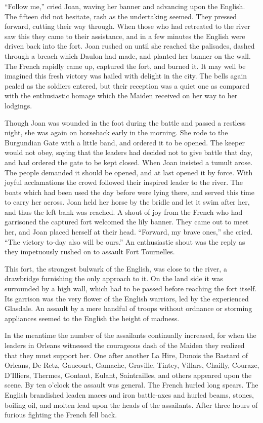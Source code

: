 ``Follow me,'' cried Joan, waving her banner and advancing upon the
English. The fifteen did not hesitate, rash as the undertaking seemed.
They pressed forward, cutting their way through. When those who had
retreated to the river saw this they came to their assistance, and in a
few minutes the English were driven back into the fort. Joan rushed on
until she reached the palisades, dashed through a breach which Daulon
had made, and planted her banner on the wall. The French rapidly came
up, captured the fort, and burned it. It may well be imagined this fresh
victory was hailed with delight in the city. The bells again pealed as
the soldiers entered, but their reception was a quiet one as compared
with the enthusiastic homage which the Maiden received on her way to her
lodgings.

Though Joan was wounded in the foot during the battle and passed a
restless night, she was again on horseback early in the morning. She
rode to the Burgundian Gate with a little band, and ordered it to be
opened. The keeper would not obey, saying that the leaders had decided
not to give battle that day, and had ordered the gate to be kept closed.
When Joan insisted a tumult arose. The people demanded it should be
opened, and at last opened it by force. With joyful acclamations the
crowd followed their inspired leader to the river. The boats which had
been used the day before were lying there, and served this time to carry
her across. Joan held her horse by the bridle and let it swim after her,
and thus the left bank was reached. A shout of joy from the French who
had garrisoned the captured fort welcomed the lily banner. They came out
to meet her, and Joan placed herself at their head. ``Forward, my brave
ones,'' she cried. ``The victory to-day also will be ours.'' An
enthusiastic shout was the reply as they impetuously rushed on to
assault Fort Tournelles.

This fort, the strongest bulwark of the English, was close to the river,
a drawbridge furnishing the only approach to it. On the land side it was
surrounded by a high wall, which had to be passed before reaching the
fort itself. Its garrison was the very flower of the English warriors,
led by the experienced Glasdale. An assault by a mere handful of troops
without ordnance or storming appliances seemed to the English the height
of madness.

In the meantime the number of the assailants continually increased, for
when the leaders in Orleans witnessed the courageous dash of the Maiden
they realized that they must support her. One after another La Hire,
Dunois the Bastard of Orleans, De Retz, Gaucourt, Gamache, Graville,
Tintey, Villars, Chailly, Couraze, D'Illiers, Thermes, Gontaut, Eulant,
Saintrailles, and others appeared upon the scene. By ten o'clock the
assault was general. The French hurled long spears. The English
brandished leaden maces and iron battle-axes and hurled beams, stones,
boiling oil, and molten lead upon the heads of the assailants. After
three hours of furious fighting the French fell back.

